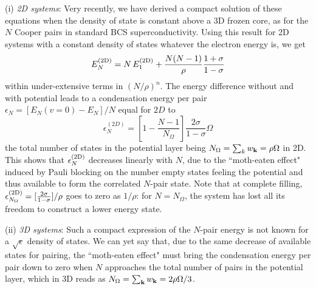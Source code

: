 \documentclass[5p,twocolumn]{elsarticle}
\begin{document}
(i) {\it 2D systems}: Very recently\cite{moth,CombTren}, we have derived a compact solution of these equations when the density of state is constant above a 3D frozen core, as for the $N$ Cooper pairs  in standard BCS superconductivity. Using this result  for 2D systems with a constant density of states whatever the electron energy is, we get
\begin{equation}\label{eq:E2dN}
 E^{{\text{(2D)}}}_N=N\,E^{{\text{(2D)}}}_1+\frac{N(N-1)}{\rho}\frac{1+\sigma}{1-\sigma}
\end{equation}
within under-extensive terms in $(N/\rho)^{n}$.
The energy difference without and with potential
leads to a condensation energy per pair $\epsilon_N= \left[E_N(v=0)-E_N\right]/N$ equal for $2D$ to
  \begin{equation}
\epsilon^{(2D)}_N=\left[1-\frac{N-1}{N_\Omega}\right]\frac{2\sigma}{1-\sigma}\Omega\label{eq:E2D}
\end{equation}
 the total number of states in the potential layer being $N_\Omega=\sum_k{}w_{\mathbf{k}}=\rho\Omega$ in 2D. This shows that $\epsilon^{{\text{(2D)}}}_N$  decreases linearly with $N$, due to the ``moth-eaten effect" induced by Pauli blocking on the number empty states feeling the potential and thus available to form the correlated $N$-pair state.  Note that at complete filling, $
\epsilon^{{\text{(2D)}}}_{N_\Omega}=[\frac{2\sigma}{1-\sigma}]/\rho$ goes to zero as $1/\rho$: for $N=N_\Omega$, the system has lost all its freedom to construct a lower energy state.







(ii) {\it 3D systems}: Such a compact expression of the $N$-pair energy is not known for a $\sqrt{\epsilon}$ density of states. We can yet say that, due to the same decrease of available states for pairing, the ``moth-eaten effect" must bring the condensation energy per pair down to zero when $N$ approaches the total number of pairs in the potential layer, which in 3D reads as $N_\Omega=\sum_{\mathbf{k}}w_{\mathbf{k}}=2\rho \Omega/3$. 
\end{document}
